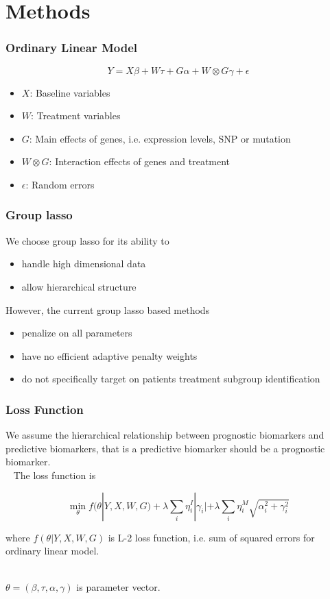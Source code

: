 \documentclass{beamer}
\begin{document}
\section{Methods}

\begin{frame}
\frametitle{Ordinary Linear Model}

$$Y=X\beta + W\tau + G\alpha + W\otimes G \gamma+\epsilon$$

\begin{itemize}
    \item $X$: Baseline variables
    \item $W$: Treatment variables
    \item $G$: Main effects of genes, i.e. expression levels, SNP or mutation
    \item $W\otimes G$: Interaction effects of genes and treatment
    \item $\epsilon$: Random errors
\end{itemize}
\end{frame}

\begin{frame}
\frametitle{Group lasso}

We choose group lasso for its ability to 

\begin{itemize}
    \item handle high dimensional data
    \item allow hierarchical structure
\end{itemize}

However, the current group lasso based methods

\begin{itemize}
    \item penalize on all parameters
    \item have no efficient adaptive penalty weights
    \item do not specifically target on patients treatment subgroup identification
\end{itemize}

\end{frame}

\begin{frame}
\frametitle{Loss Function}

We assume the hierarchical relationship between prognostic biomarkers and predictive biomarkers, 
that is a predictive biomarker should be a prognostic biomarker.\\~
The loss function is

$$\min_{\theta} f(\theta|Y,X,W,G) + \lambda \sum_i \eta_i^I |\gamma_i| + \lambda \sum_i \eta_i^M \sqrt{\alpha_i^2 + \gamma_i^2}$$

where $f(\theta|Y,X,W,G)$ is L-2 loss function, i.e. sum of squared errors for ordinary linear model.\\~

$\theta=(\beta, \tau, \alpha, \gamma)$ is parameter vector.



\end{frame}
\end{document}
